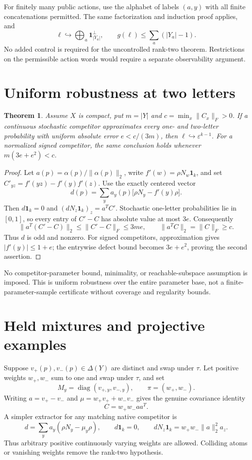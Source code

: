 \documentclass[11pt]{article}
\newtheorem{theorem}{Theorem}[section]
\theoremstyle{definition}
\newcommand{\one}{\mathbf 1}
\newcommand{\eps}{\varepsilon}
\newcommand{\diag}{\operatorname{diag}}
\begin{document}
For finitely many public actions, use the alphabet of labels $(a,y)$ with all finite concatenations permitted. The same factorization and induction proof applies, and
\[
 \ell\hookrightarrow\bigoplus_a\one_{|Y_a|}^{\perp},\qquad
 g(\ell)\leq\sum_a(|Y_a|-1).
\]
No added control is required for the uncontrolled rank-two theorem. Restrictions on the permissible action words would require a separate observability argument.

\section{Uniform robustness at two letters}
\begin{theorem}\label{thm:robust}
Assume $X$ is compact, put $m=|Y|$ and $c=\min_x\|C_x\|_F>0$. If a continuous stochastic competitor approximates every one- and two-letter probability with uniform absolute error $e<c/(3m)$, then $\ell\hookrightarrow\eps^{k-1}$. For a normalized signed competitor, the same conclusion holds whenever $m(3e+e^2)<c$.
\end{theorem}
\begin{proof}
Let $a(p)=\alpha(p)/\|\alpha(p)\|_2$, write $f'(w)=\rho N_w\one_k$, and set $C'_{yz}=f'(yz)-f'(y)f'(z)$. Use the exactly centered vector
\[
 d(p)=\sum_ya_y(p)\bigl[\rho N_y-f'(y)\rho\bigr].
\]
Then $d\one_k=0$ and $(dN_z\one_k)_z=a^TC'$. Stochastic one-letter probabilities lie in $[0,1]$, so every entry of $C'-C$ has absolute value at most $3e$. Consequently
\[
 \|a^T(C'-C)\|_2\leq\|C'-C\|_F\leq3me,
 \qquad \|a^TC\|_2=\|C\|_F\geq c.
\]
Thus $d$ is odd and nonzero. For signed competitors, approximation gives $|f'(y)|\leq1+e$; the entrywise defect bound becomes $3e+e^2$, proving the second assertion.
\end{proof}
No competitor-parameter bound, minimality, or reachable-subspace assumption is imposed. This is uniform robustness over the entire parameter base, not a finite-parameter-sample certificate without coverage and regularity bounds.

\section{Held mixtures and projective examples}
Suppose $v_+(p),v_-(p)\in\Delta(Y)$ are distinct and swap under $\tau$. Let positive weights $w_+,w_-$ sum to one and swap under $\tau$, and set
\[
 M_y=\diag(v_{+,y},v_{-,y}),\qquad \pi=(w_+,w_-).
\]
Writing $a=v_+-v_-$ and $\mu=w_+v_++w_-v_-$ gives the genuine covariance identity
\[
 C=w_+w_-aa^T.
\]
A simpler extractor for any matching native competitor is
\[
 d=\sum_ya_y(\rho N_y-\mu_y\rho),\qquad
 d\one_k=0,\qquad dN_z\one_k=w_+w_-\|a\|_2^2a_z.
\]
Thus arbitrary positive continuously varying weights are allowed. Colliding atoms or vanishing weights remove the rank-two hypothesis.
\end{document}
